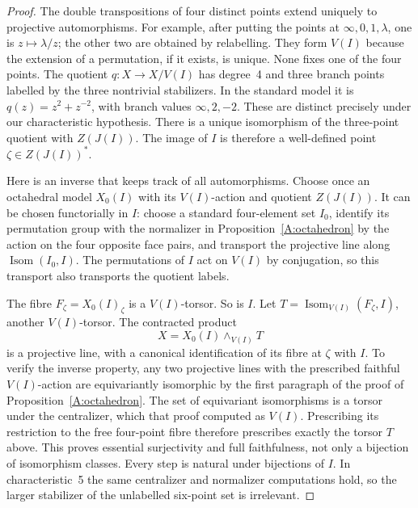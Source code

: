 \begin{proof}
The double transpositions of four distinct points extend uniquely to
projective automorphisms. For example, after putting the points at
$\infty,0,1,\lambda$, one is $z\mapsto\lambda/z$; the other two
are obtained by relabelling. They form $V(I)$ because the extension
of a permutation, if it exists, is unique. None fixes one of the four
points. The quotient $q:X\to X/V(I)$ has degree~4 and three branch
points labelled by the three nontrivial stabilizers. In the standard
model it is $q(z)=z^2+z^{-2}$, with branch values $\infty,2,-2$.
These are distinct precisely under our characteristic hypothesis.
There is a unique isomorphism of the three-point quotient with
$Z(J(I))$. The image of $I$ is therefore a well-defined point
$\zeta\in Z(J(I))^*$.

Here is an inverse that keeps track of all automorphisms. Choose once
an octahedral model $X_0(I)$ with its $V(I)$-action and quotient
$Z(J(I))$. It can be chosen functorially in $I$: choose a standard
four-element set $I_0$, identify its permutation group with the
normalizer in Proposition~\ref{A:octahedron} by the action on the four
opposite face pairs, and transport the projective line along
$\operatorname{Isom}(I_0,I)$. The permutations of $I$ act on $V(I)$
by conjugation, so this transport also transports the quotient labels.

The fibre $F_\zeta=X_0(I)_\zeta$ is a $V(I)$-torsor. So is $I$.
Let $T=\operatorname{Isom}_{V(I)}(F_\zeta,I)$, another $V(I)$-torsor.
The contracted product
\[
 X=X_0(I)\mathbin{\wedge}_{V(I)}T
\]
is a projective line, with a canonical identification of its fibre at
$\zeta$ with $I$. To verify the inverse property, any two projective
lines with the prescribed faithful $V(I)$-action are equivariantly
isomorphic by the first paragraph of the proof of
Proposition~\ref{A:octahedron}. The set of equivariant isomorphisms
is a torsor under the centralizer, which that proof computed as
$V(I)$. Prescribing its restriction to the free four-point fibre
therefore prescribes exactly the torsor $T$ above. This proves
essential surjectivity and full faithfulness, not only a bijection of
isomorphism classes. Every step is natural under bijections of $I$.
In characteristic~5 the same centralizer and normalizer computations
hold, so the larger stabilizer of the unlabelled six-point set is
irrelevant.
\end{proof}

